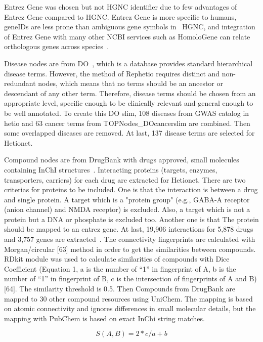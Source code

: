 Entrez Gene was chosen but not \ac{HGNC} identifier due to few advantages of Entrez Gene compared to \ac{HGNC}. Entrez Gene is more specific to humans, geneIDs are less prone than ambiguous gene symbols in ~\ac{HGNC}, and integration of Entrez Gene with many other NCBI services such as HomoloGene can relate orthologous genes across species~\cite{himmelstein_entrez_2015}.

Disease nodes are from \ac{DO}~\cite{schriml_disease_2012}, which is a database provides standard hierarchical disease terms. However, the method of Rephetio requires distinct and non-redundant nodes, which means that no terms should be an ancestor or descendant of any other term. Therefore, disease terms should be chosen from an appropriate level, specific enough to be clinically relevant and general enough to be well annotated. To create this DO slim, 108 diseases from GWAS catalog in hetio and 63 cancer terms from TOPNodes\_DOcancerslim are combined. Then some overlapped diseases are removed. At last, 137 disease terms are selected for Hetionet.

Compound nodes are from DrugBank with drugs approved, small molecules containing InChI structures~\cite{law_drugbank_2014}. Interacting proteins (targets, enzymes, transporters, carriers) for each drug are extracted for Hetionet. There are two criterias for proteins to be included. One is that the interaction is between a drug and single protein. A target which is a "protein group" (e.g., GABA-A receptor (anion channel) and NMDA receptor) is excluded. Also, a target which is not a protein but a DNA or phosphate is excluded too. Another one is that The protein should be mapped to an entrez gene. At last, 19,906 interactions for 5,878 drugs and 3,757 genes are extracted~\cite{himmelstein_protein_2015}. The connectivity fingerprints are calculated with Morgan/circular [63] method in order to get the similarities between compounds. RDkit module was used to calculate similarities of compounds with Dice Coefficient (Equation 1, a is the number of “1” in fingerprint of A, b is the number of “1” in fingerprint of B, c is the intersection of fingerprints of A and B) [64]. The similarity threshold is 0.5. Then Compounds from DrugBank are mapped to 30 other compound resources using UniChem. The mapping is based on atomic connectivity and ignores differences in small molecular details, but the mapping with PubChem is based on exact InChi string matches.

\begin{equation}
S(A,B) = 2 *c / a +b
\end{equation}

